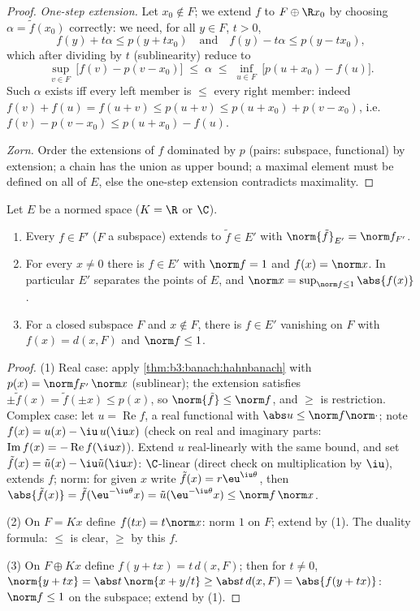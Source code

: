 \begin{proof}
\emph{One-step extension.} Let $x_0 \notin F$; we extend $f$ to
$F \oplus \R x_0$ by choosing $\alpha = \tilde f(x_0)$
correctly: we need, for all $y \in F$, $t > 0$,
\[
f(y) + t\alpha \leq p(y + tx_0)
\quad\text{and}\quad
f(y) - t\alpha \leq p(y - tx_0),
\]
which after dividing by $t$ (sublinearity) reduce to
\[
\sup_{v \in F}\ \bigl[f(v) - p(v - x_0)\bigr]
\;\leq\; \alpha \;\leq\;
\inf_{u \in F}\ \bigl[p(u + x_0) - f(u)\bigr].
\]
Such $\alpha$ exists iff every left member is $\leq$ every
right member: indeed $f(v) + f(u) = f(u + v) \leq p(u + v) \leq
p(u + x_0) + p(v - x_0)$, i.e.\ $f(v) - p(v - x_0) \leq p(u +
x_0) - f(u)$.

\emph{Zorn.} Order the extensions of $f$ dominated by $p$
(pairs: subspace, functional) by extension; a chain has the
union as upper bound; a maximal element must be defined on all
of $E$, else the one-step extension contradicts maximality.
\end{proof}

\begin{corollary}\label{cor:b3:banach:hbnormed}
Let $E$ be a normed space ($K = \R$ or $\C$).
\begin{enumerate}
  \item Every $f \in F'$ ($F$ a subspace) extends to $\tilde f
        \in E'$ with $\norm{\tilde f}_{E'} = \norm f_{F'}$.
  \item For every $x \neq 0$ there is $f \in E'$ with $\norm f
        = 1$ and $f(x) = \norm x$. In particular $E'$ separates
        the points of $E$, and $\norm x = \sup_{\norm f \leq
        1}\abs{f(x)}$.
  \item For a closed subspace $F$ and $x \notin F$, there is $f
        \in E'$ vanishing on $F$ with $f(x) = d(x, F)$ and
        $\norm f \leq 1$.
\end{enumerate}
\end{corollary}

\begin{proof}
(1) Real case: apply \cref{thm:b3:banach:hahnbanach} with $p(x)
= \norm f_{F'}\,\norm x$ (sublinear); the extension satisfies
$\pm\tilde f(x) = \tilde f(\pm x) \leq p(x)$, so
$\norm{\tilde f} \leq \norm f$, and $\geq$ is restriction.
Complex case: let $u = \operatorname{Re}f$, a real functional
with $\abs u \leq \norm f\norm\cdot$; note $f(x) = u(x) -
\iu\,u(\iu x)$ (check on real and imaginary parts:
$\operatorname{Im}f(x) = -\operatorname{Re}f(\iu x)$). Extend
$u$ real-linearly with the same bound, and set $\tilde f(x) =
\tilde u(x) - \iu\tilde u(\iu x)$: $\C$-linear (direct check on
multiplication by $\iu$), extends $f$; norm: for given $x$
write $\tilde f(x) = r\eu^{\iu\theta}$, then $\abs{\tilde f(x)}
= \tilde f(\eu^{-\iu\theta}x) = \tilde u(\eu^{-\iu\theta}x)
\leq \norm f\,\norm x$.

(2) On $F = Kx$ define $f(tx) = t\norm x$: norm $1$ on $F$;
extend by (1). The duality formula: $\leq$ is clear, $\geq$ by
this $f$.

(3) On $F \oplus Kx$ define $f(y + tx) = t\,d(x, F)$; then for
$t \neq 0$, $\norm{y + tx} = \abs t\,\norm{x + y/t} \geq \abs
t\,d(x, F) = \abs{f(y + tx)}$: $\norm f \leq 1$ on the
subspace; extend by (1).
\end{proof}

